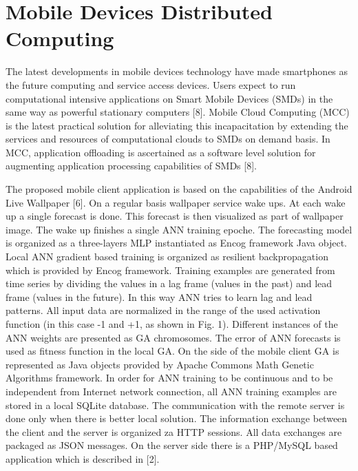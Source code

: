\documentclass{llncs}
\begin{document}
\section{Mobile Devices Distributed Computing}
%
The latest developments in mobile devices technology have made smartphones as the future computing and service access devices. Users expect to run computational intensive applications on Smart Mobile Devices (SMDs) in the same way as powerful stationary computers [8]. Mobile Cloud Computing (MCC) is the latest practical solution for alleviating this incapacitation by extending the services and resources of computational clouds to SMDs on demand basis. In MCC, application offloading is ascertained as a software level solution for augmenting application processing capabilities of SMDs [8]. 

The proposed mobile client application is based on the capabilities of the Android Live Wallpaper [6]. On a regular basis wallpaper service wake ups. At each wake up a single forecast is done. This forecast is then visualized as part of wallpaper image. The wake up finishes a single ANN training epoche. The forecasting model is organized as a three-layers MLP instantiated as Encog framework Java object. Local ANN gradient based training is organized as resilient backpropagation which is provided by Encog framework. Training examples are generated from time series by dividing the values in a lag frame (values in the past) and lead frame (values in the future). In this way ANN tries to learn lag and lead patterns. All input data are normalized in the range of the used activation function (in this case -1 and +1, as shown in Fig. 1). Different instances of the ANN weights are presented as GA chromosomes. The error of ANN forecasts is used as fitness function in the local GA. On the side of the mobile client GA is represented as Java objects provided by Apache Commons Math Genetic Algorithms framework. In order for ANN training to be continuous and to be independent from Internet network connection, all ANN training examples are stored in a local SQLite database. The communication with the remote server is done only when there is better local solution. The information exchange between the client and the server is organized za HTTP sessions. All data exchanges are packaged as JSON messages. On the server side there is a PHP/MySQL based application which is described in [2]. 
%
\end{document}
